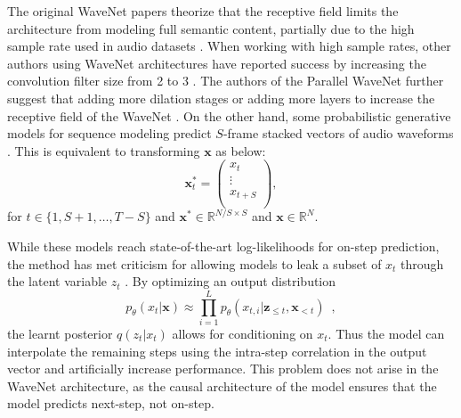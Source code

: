 The original WaveNet papers theorize that the receptive field limits the architecture from modeling full semantic content, partially due to the high sample rate used in audio datasets \cite{oord_wavenet_2016}.
When working with high sample rates, other authors using WaveNet architectures have reported success by increasing the convolution filter size from 2 to 3 \cite{oord_parallel_2017}.
The authors of the Parallel WaveNet further suggest that adding more dilation stages or adding more layers to increase the receptive field of the WaveNet \cite{oord_parallel_2017}.
On the other hand, some probabilistic generative models for sequence modeling %
predict $S$-frame stacked vectors of audio waveforms \cite{fraccaro_sequential_2016, chung_recurrent_2016}.
This is equivalent to transforming $\mathbf{x}$ as below:
\begin{equation}\label{data:eq-transform}
    \mathbf{x}^*_t = \begin{pmatrix}
        x_{t} \\ \vdots \\ x_{t+S} \\
    \end{pmatrix},
\end{equation}
for $t\in\{1,S+1,\dots,T-S\}$ and $\mathbf{x}^*\in\mathbb{R}^{N/S \times S}$ and $\mathbf{x}\in\mathbb{R}^{N}$.

While these models reach state-of-the-art log-likelihoods for on-step prediction, the method has met criticism for allowing models to leak a subset of $x_t$ through the latent variable $z_t$ \cite{dai_re-examination_2019}. 
By optimizing an output distribution 
\[
p_\theta(x_t | \mathbf{x}) \approx \prod_{i=1}^L p_\theta (x_{t,i}|\mathbf{z}_{\leq t} , \mathbf{x}_{<t}) \enspace ,
\]
the learnt posterior $q(z_t|x_t)$ allows for conditioning on $x_t$.
Thus the model can interpolate the remaining steps using the intra-step correlation in the output vector and artificially increase performance. \cite{dai_re-examination_2019}
This problem does not arise in the WaveNet architecture, as the causal architecture of the model ensures that the model predicts next-step, not on-step. 

